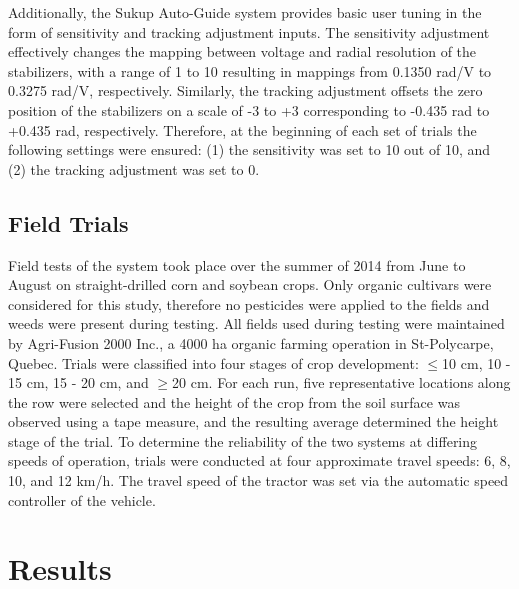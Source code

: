 \documentclass[authoryear]{elsarticle}
\begin{document}
Additionally, the Sukup Auto-Guide system provides basic user tuning
in the form of sensitivity and tracking adjustment inputs. The
sensitivity adjustment effectively changes the mapping between voltage
and radial resolution of the stabilizers, with a range of 1 to 10
resulting in mappings from 0.1350 rad/V to 0.3275 rad/V,
respectively. Similarly, the tracking adjustment offsets the zero
position of the stabilizers on a scale of -3 to +3 corresponding to
-0.435 rad to +0.435 rad, respectively. Therefore, at the beginning of
each set of trials the following settings were ensured: (1) the
sensitivity was set to 10 out of 10, and (2) the tracking adjustment
was set to 0.

\subsection{Field Trials}
Field tests of the system took place over the summer of 2014 from June
to August on straight-drilled corn and soybean crops. Only organic
cultivars were considered for this study, therefore no pesticides were
applied to the fields and weeds were present during testing. All
fields used during testing were maintained by Agri-Fusion 2000 Inc., a
4000 ha organic farming operation in St-Polycarpe, Quebec. Trials were
classified into four stages of crop development: $\le$10 cm, 10 - 15
cm, 15 - 20 cm, and $\ge$20 cm. For each run, five representative
locations along the row were selected and the height of the crop from
the soil surface was observed using a tape measure, and the resulting
average determined the height stage of the trial. To determine the
reliability of the two systems at differing speeds of operation,
trials were conducted at four approximate travel speeds: 6, 8, 10, and
12 km/h. The travel speed of the tractor was set via the automatic
speed controller of the vehicle.


\section{Results}
\end{document}
